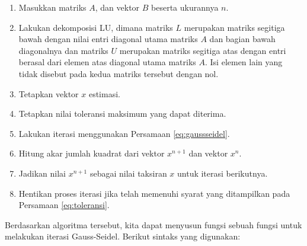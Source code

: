 \documentclass[]{book}
\providecommand{\tightlist}{%
  \setlength{\itemsep}{0pt}\setlength{\parskip}{0pt}}
\theoremstyle{definition}
\theoremstyle{definition}
\theoremstyle{definition}
\theoremstyle{remark}
\begin{document}
\begin{enumerate}
\def\labelenumi{\arabic{enumi}.}
\tightlist
\item
  Masukkan matriks \(A\), dan vektor \(B\) beserta ukurannya \(n\).
\item
  Lakukan dekomposisi LU, dimana matriks \(L\) merupakan matriks segitiga bawah dengan nilai entri diagonal utama matriks \(A\) dan bagian bawah diagonalnya dan matriks \(U\) merupakan matriks segitiga atas dengan entri berasal dari elemen atas diagonal utama matriks \(A\). Isi elemen lain yang tidak disebut pada kedua matriks tersebut dengan nol.
\item
  Tetapkan vektor \(x\) estimasi.
\item
  Tetapkan nilai toleransi maksimum yang dapat diterima.
\item
  Lakukan iterasi menggunakan Persamaan \eqref{eq:gaussseidel}.
\item
  Hitung akar jumlah kuadrat dari vektor \(x^{n+1}\) dan vektor \(x^n\).
\item
  Jadikan nilai \(x^{n+1}\) sebagai nilai taksiran \(x\) untuk iterasi berikutnya.
\item
  Hentikan proses iterasi jika telah memenuhi syarat yang ditampilkan pada Persamaan \eqref{eq:toleransi}.
\end{enumerate}

Berdasarkan algoritma tersebut, kita dapat menyusun fungsi sebuah fungsi untuk melakukan iterasi Gauss-Seidel. Berikut sintaks yang digunakan:
\end{document}

